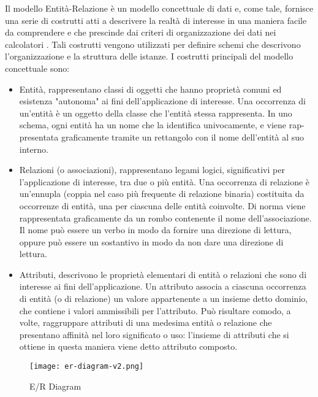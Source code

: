 Il modello Entità-Relazione è un modello concettuale di dati e, come tale, fornisce una serie di costrutti atti a descrivere la realtà di interesse in una maniera facile da comprendere e che prescinde dai criteri di organizzazione dei dati nei calcolatori \cite{basidati}. Tali costrutti vengono utilizzati per definire schemi che descrivono l'organizzazione e la struttura delle istanze.
I costrutti principali del modello concettuale sono:
\begin{itemize}
    \item Entità, rappresentano classi di oggetti che hanno proprietà comuni ed esistenza "autonoma" ai fini dell’applicazione di interesse. Una occorrenza di un'entità è un oggetto della classe che l'entità stessa rappresenta. In uno schema, ogni entità ha un nome che la identifica univocamente, e viene rap-presentata graficamente tramite un rettangolo con il nome dell'entità al suo interno.
    \item Relazioni (o associazioni), rappresentano legami logici, significativi per l'applicazione di interesse, tra due o più entità. Una occorrenza di relazione è un'ennupla (coppia nel caso più frequente di relazione binaria) costituita da occorrenze di entità, una per ciascuna delle entità coinvolte. Di norma viene rappresentata graficamente da un rombo contenente il nome dell'associazione. Il nome può essere un verbo in modo da fornire una direzione di lettura, oppure può essere un sostantivo in modo da non dare una direzione di lettura.
    \item Attributi, descrivono le proprietà elementari di entità o relazioni che sono di interesse ai fini dell'applicazione. Un attributo associa a ciascuna occorrenza di entità (o di relazione) un valore appartenente a un insieme detto dominio, che contiene i valori ammissibili per l’attributo. Può risultare comodo, a volte, raggruppare attributi di una medesima entità o relazione che presentano affinità nel loro significato o uso: l’insieme di attributi che si ottiene in questa maniera viene detto attributo composto.
\end{itemize}

\begin{figure}[H]
    \centering
    \texttt{[image: er-diagram-v2.png]}
    \caption{E/R Diagram}
    \label{fig:ErDiagram}
\end{figure}

